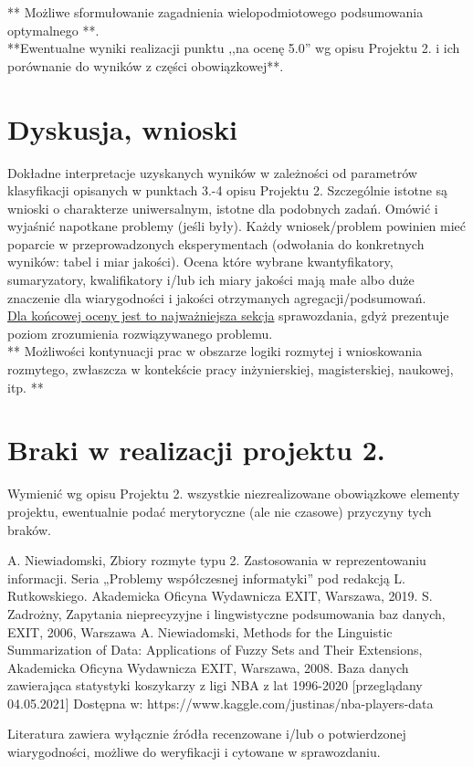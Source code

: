 \documentclass{classrep}
\begin{document}
** Możliwe sformułowanie zagadnienia wielopodmiotowego podsumowania optymalnego **.\\

{**Ewentualne wyniki realizacji punktu ,,na ocenę 5.0'' wg opisu Projektu 2. i ich porównanie do wyników z
części obowiązkowej**.}\\



\section{Dyskusja, wnioski}
Dokładne interpretacje uzyskanych wyników w zależności od parametrów klasyfikacji
opisanych w punktach 3.-4 opisu Projektu 2. 
Szczególnie istotne są wnioski o charakterze uniwersalnym, istotne dla podobnych zadań. 
Omówić i wyjaśnić napotkane problemy (jeśli były). Każdy wniosek/problem powinien mieć poparcie
w przeprowadzonych eksperymentach (odwołania do konkretnych wyników: tabel i miar
jakości). Ocena które wybrane kwantyfikatory, sumaryzatory, kwalifikatory i/lub ich
miary jakości mają małe albo duże znaczenie dla wiarygodności i jakości otrzymanych
agregacji/podsumowań.  \\
\underline{Dla końcowej oceny jest to najważniejsza sekcja} sprawozdania, gdyż prezentuje poziom
zrozumienia rozwiązywanego problemu.\\

** Możliwości kontynuacji prac w obszarze logiki rozmytej i wnioskowania rozmytego, zwłaszcza w kontekście pracy inżynierskiej,
magisterskiej, naukowej, itp. **\\



\section{Braki w realizacji projektu 2.}
Wymienić wg opisu Projektu 2. wszystkie niezrealizowane obowiązkowe elementy projektu, ewentualnie
podać merytoryczne (ale nie czasowe) przyczyny tych braków. 


\begin{thebibliography}{99}
  A. Niewiadomski, Zbiory rozmyte typu 2. Zastosowania w reprezentowaniu informacji.  Seria „Problemy współczesnej informatyki” pod redakcją L. Rutkowskiego. Akademicka Oficyna Wydawnicza EXIT, Warszawa, 2019.
 S. Zadrożny, Zapytania nieprecyzyjne i lingwistyczne podsumowania baz danych, EXIT, 2006, Warszawa
 A. Niewiadomski, Methods for the Linguistic Summarization of Data: Applications of Fuzzy Sets and Their Extensions, Akademicka Oficyna Wydawnicza EXIT, Warszawa, 2008.
 Baza danych zawierająca statystyki koszykarzy z ligi NBA z lat 1996-2020 [przeglądany 04.05.2021] Dostępna w:
https://www.kaggle.com/justinas/nba-players-data
\end{thebibliography}

Literatura zawiera wyłącznie źródła recenzowane i/lub o potwierdzonej wiarygodności,
możliwe do weryfikacji i cytowane w sprawozdaniu. 
\end{document}
